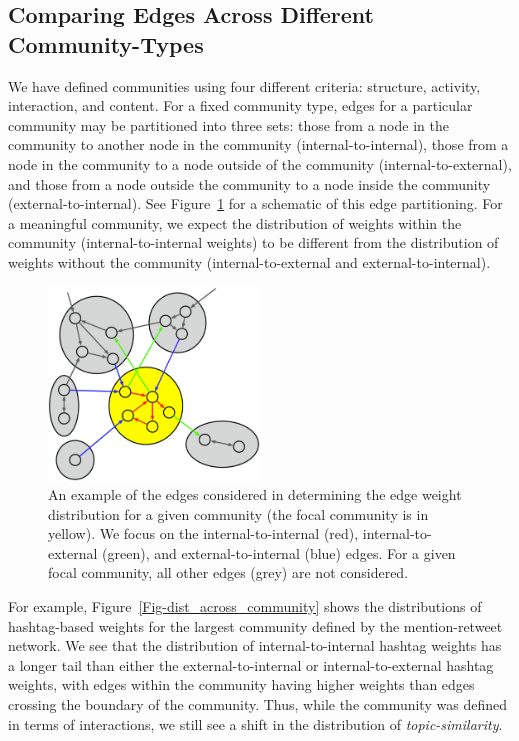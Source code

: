 \subsection{Comparing Edges Across Different Community-Types}

We have defined communities using four different criteria: structure, activity, interaction, and content. For a fixed community type, edges for a particular community may be partitioned into three sets: those from a node in the community to another node in the community (internal-to-internal), those from a node in the community to a node outside of the community (internal-to-external), and those from a node outside the community to a node inside the community (external-to-internal). See Figure~\ref{Fig-edge_types} for a schematic of this edge partitioning. For a meaningful community, we expect the distribution of weights within the community (internal-to-internal weights) to be different from the distribution of weights without the community (internal-to-external and external-to-internal).

\begin{figure}[ht]
  \centering
\includegraphics[width=0.50\textwidth]{figures/edge-types.eps}
\caption{An example of the edges considered in determining the edge weight distribution for a given community (the focal community is in yellow). We focus on the internal-to-internal (red), internal-to-external (green), and external-to-internal (blue) edges. For a given focal community, all other edges (grey) are not considered.}
\label{Fig-edge_types}
\end{figure}

For example, Figure~\ref{Fig-dist_across_community} shows the distributions of hashtag-based weights for the largest community defined by the mention-retweet network. We see that the distribution of internal-to-internal hashtag weights has a longer tail than either the external-to-internal or internal-to-external hashtag weights, with edges within the community having higher weights than edges crossing the boundary of the community. Thus, while the community was defined in terms of interactions, we still see a shift in the distribution of \emph{topic-similarity}.

